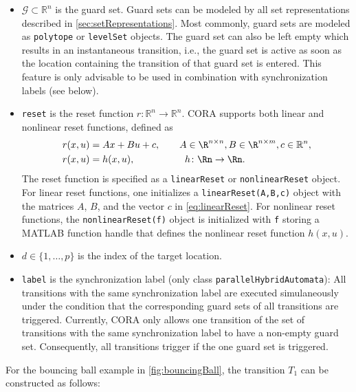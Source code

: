 \begin{itemize}
    \item $\mathcal{G} \subset \mathbb{R}^n$ is the guard set. Guard sets can be modeled by all set representations described in \cref{sec:setRepresentations}.
    Most commonly, guard sets are modeled as \texttt{polytope} or \texttt{levelSet} objects.
    The guard set can also be left empty which results in an instantaneous transition, i.e., the guard set is active as soon as the location containing the transition of that guard set is entered. This feature is only advisable to be used in combination with synchronization labels (see below).
    \item \texttt{reset} is the reset function $r\colon \mathbb{R}^n \to \mathbb{R}^n$. CORA supports both linear and nonlinear reset functions, defined as
    \begin{align}
        r(x,u) &= A x + B u + c, \qquad A \in \R^{n \times n}, B \in \R^{n \times m}, c \in \mathbb{R}^n, \label{eq:linearReset} \\
        r(x,u) &= h(x,u), \hspace{52pt} h\colon \Rn \to \Rn . \label{eq:nonlinearReset}
    \end{align}
    The reset function is specified as a \texttt{linearReset} or \texttt{nonlinearReset} object.
    For linear reset functions, one initializes a \texttt{linearReset(A,B,c)} object with the matrices $A$, $B$, and the vector $c$ in \eqref{eq:linearReset}.
    For nonlinear reset functions, the \texttt{nonlinearReset(f)} object is initialized with \texttt{f} storing a MATLAB function handle that defines the nonlinear reset function $h(x,u)$.

    \item $d \in \{1,\dots,p\}$ is the index of the target location.
    \item \texttt{label} is the synchronization label (only class \texttt{parallelHybridAutomata}): All transitions with the same synchronization label are executed simulaneously under the condition that the corresponding guard sets of all transitions are triggered. Currently, CORA only allows one transition of the set of transitions with the same synchronization label to have a non-empty guard set.
    Consequently, all transitions trigger if the one guard set is triggered.
\end{itemize}

For the bouncing ball example in \cref{fig:bouncingBall}, the transition $T_1$ can be constructed as follows:

